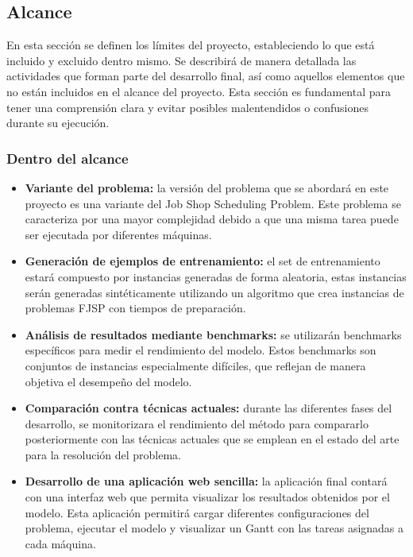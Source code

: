 \subsection{Alcance}
En esta sección se definen los límites del proyecto, estableciendo lo que está
incluido y excluido dentro mismo. Se describirá de manera detallada las
actividades que forman parte del desarrollo final, así como aquellos elementos
que no están incluidos en el alcance del proyecto. Esta sección es fundamental
para tener una comprensión clara y evitar posibles malentendidos o confusiones
durante su ejecución.

\subsubsection{Dentro del alcance}
\begin{itemize}
    \item \textbf{Variante del problema:} la versión del problema que se abordará en este proyecto
          es una variante del Job Shop Scheduling Problem. Este problema se caracteriza por una mayor
          complejidad debido a que una misma tarea puede ser ejecutada por diferentes máquinas.
    \item \textbf{Generación de ejemplos de entrenamiento:} el set de entrenamiento estará compuesto
          por instancias generadas de forma aleatoria, estas instancias serán generadas sintéticamente
          utilizando un algoritmo que crea instancias de problemas FJSP con tiempos de preparación.
    \item \textbf{Análisis de resultados mediante benchmarks:} se utilizarán benchmarks
          específicos para medir el rendimiento del modelo. Estos benchmarks son conjuntos de instancias
          especialmente difíciles, que reflejan de manera objetiva el desempeño del modelo.
    \item \textbf{Comparación contra técnicas actuales:} durante las diferentes fases del desarrollo,
          se monitorizara el rendimiento del método para compararlo posteriormente con las técnicas actuales
          que se emplean en el estado del arte para la resolución del problema.
    \item \textbf{Desarrollo de una aplicación web sencilla:} la aplicación final contará con una interfaz
          web que permita visualizar los resultados obtenidos por el modelo. Esta aplicación
          permitirá cargar diferentes configuraciones del problema, ejecutar el modelo y visualizar
          un Gantt con las tareas asignadas a cada máquina.
\end{itemize}

